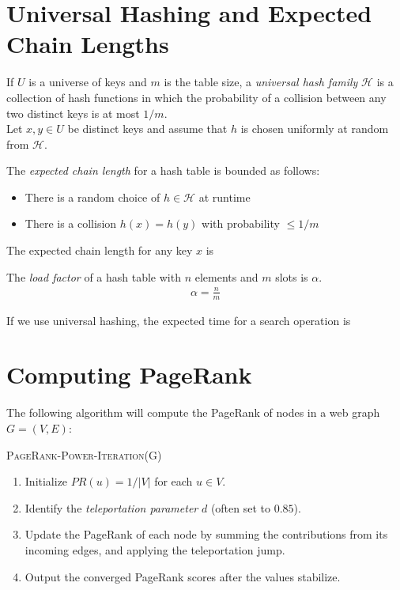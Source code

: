 \documentclass[11pt]{exam}
\begin{document}
	\section{Universal Hashing and Expected Chain Lengths}
	If $U$ is a universe of keys and $m$ is the table size, a \emph{universal hash family} $\mathcal{H}$ is a collection of hash functions in which the probability of a collision between any two distinct keys is at most $1/m$. \\
	
	Let $x, y \in U$ be distinct keys and assume that $h$ is chosen uniformly at random from $\mathcal{H}$. 
	
	The \emph{expected chain length} for a hash table is bounded as follows:
	\begin{itemize}
		\item There is a random choice of $h \in \mathcal{H}$ at runtime
		\item There is a collision $h(x) = h(y)$ with probability $\le 1/m$
	\end{itemize}
	\begin{lemma}
		The expected chain length for any key $x$ is 
	\end{lemma}
	
	\vs{5cm}
	
	The \emph{load factor} of a hash table with $n$ elements and $m$ slots is $\alpha$.
	\begin{align*}
		\alpha = \frac{n}{m}
	\end{align*}
	
	\begin{lemma}
		If we use universal hashing, the expected time for a search operation is \hide{$\Theta(1 + \alpha)$ }
	\end{lemma}
	
	\newpage
	
	
	
	
	
	\section{Computing PageRank}
	The following algorithm will compute the PageRank of nodes in a web graph $G = (V,E)$:
	
	\textsc{PageRank-Power-Iteration}(G)
	\begin{enumerate}
		\item Initialize $PR(u) = 1/|V|$ for each $u \in V$.
		\item Identify the \emph{teleportation parameter} $d$ (often set to $0.85$).
		\item Update the PageRank of each node by summing the contributions from its incoming edges, and applying the teleportation jump.
		\item Output the converged PageRank scores after the values stabilize. 
	\end{enumerate}
	\newpage
\end{document}
